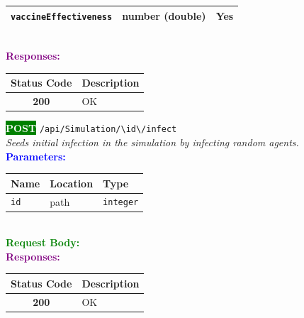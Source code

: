 \begin{tcolorbox}[
    colback=orange!5,
    colframe=orange,
    arc=2mm,
    boxrule=1pt,
    left=5pt,
    right=5pt,
    top=5pt,
    bottom=5pt
]
\begin{tabular}{|l|l|l|}
\rowcolor{gray!5}
\texttt{vaccineEffectiveness} & number (double) & Yes \\ \hline
\end{tabular}\\[0.5em]
\vspace{0.3em}
\textbf{\textcolor{purple}{Responses:}}\\[0.2em]
\begin{tabular}{|c|p{10cm}|}
\hline
\rowcolor{gray!20}
\textbf{Status Code} & \textbf{Description} \\ \hline
\colorbox{green!20}{\textbf{200}} & OK \\ \hline
\end{tabular}
\end{tcolorbox}
\vspace{0.5em}

\begin{tcolorbox}[
    colback=green!5,
    colframe=green,
    arc=2mm,
    boxrule=1pt,
    left=5pt,
    right=5pt,
    top=5pt,
    bottom=5pt
]
\noindent\colorbox{green}{\textcolor{white}{\textbf{POST}}} 
\texttt{\large /api/Simulation/\textbackslash{}{id\textbackslash{}}/infect}\\[0.3em]
\textit{Seeds initial infection in the simulation by infecting random agents.}\\[0.3em]
\vspace{0.3em}
\textbf{\textcolor{blue}{Parameters:}}\\[0.2em]
\begin{tabular}{|l|l|l|}
\hline
\rowcolor{gray!20}
\textbf{Name} & \textbf{Location} & \textbf{Type} \\ \hline
\texttt{id} & path & \texttt{integer} \\ \hline
\end{tabular}\\[0.5em]
\vspace{0.3em}
\textbf{\textcolor{green}{Request Body:}}\\[0.2em]
\vspace{0.3em}
\textbf{\textcolor{purple}{Responses:}}\\[0.2em]
\begin{tabular}{|c|p{10cm}|}
\hline
\rowcolor{gray!20}
\textbf{Status Code} & \textbf{Description} \\ \hline
\colorbox{green!20}{\textbf{200}} & OK \\ \hline
\end{tabular}
\end{tcolorbox}
\vspace{0.5em}

